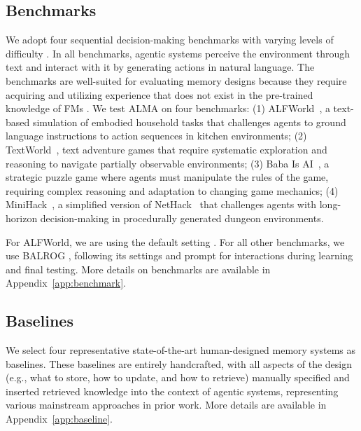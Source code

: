 \documentclass{article}
\theoremstyle{plain}
\theoremstyle{definition}
\theoremstyle{remark}
\newcommand{\ouralgo}{ALMA\xspace} %
\newif\ifcomment
\newcommand{\sh}[1]{\textcolor{violet}{\ifcomment SH: #1\else\fi}}
\begin{document}
\subsection{Benchmarks} 
\label{Benchmarks}
We adopt four sequential decision-making benchmarks with varying levels of difficulty \citep{balrog}.
In all benchmarks, agentic systems perceive the environment through text and interact with it by generating actions in natural language.
The benchmarks are well-suited for evaluating memory designs because they require acquiring and utilizing experience that does not exist in the pre-trained knowledge of FMs \citep{balrog}.
We test \ouralgo on four benchmarks: 
(1) ALFWorld~\citep{shridhar2021Alfworld}, a text-based simulation of embodied household tasks that challenges agents to ground language instructions to action sequences in kitchen environments; (2) TextWorld~\citep{textworld}, text adventure games that require systematic exploration and reasoning to navigate partially observable environments; (3) Baba Is AI~\citep{cloos2024baba}, a strategic puzzle game where agents must manipulate the rules of the game, requiring complex reasoning and adaptation to changing game mechanics; (4) MiniHack~\citep{samvelyan2021minihack}, a simplified version of NetHack~\citep{kuttler2020nle} that challenges agents with long-horizon decision-making in procedurally generated dungeon environments.

For ALFWorld, we are using the default setting \citep{shridhar2021Alfworld}. For all other benchmarks, we use BALROG \citep{balrog}, following its settings and prompt for interactions during learning and final testing. More details on benchmarks are available in Appendix~\ref{app:benchmark}.
\vspace{-0.5em}
\subsection{Baselines} 
\label{Baselines}
We select four representative state-of-the-art human-designed memory systems as baselines. These baselines are entirely handcrafted, with all aspects of the design (e.g., what to store, how to update, and how to retrieve) manually specified and inserted retrieved knowledge into the context of agentic systems, representing various mainstream approaches in prior work. More details are available in Appendix~\ref{app:baseline}.
\end{document}
